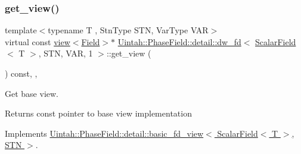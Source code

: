 \subsubsection{\texorpdfstring{get\+\_\+view()}{get\_view()}\hspace{0.1cm}{\footnotesize\ttfamily [2/2]}}
{\footnotesize\ttfamily template$<$typename T , Stn\+Type S\+TN, Var\+Type V\+AR$>$ \\
virtual const \hyperlink{classUintah_1_1PhaseField_1_1detail_1_1view}{view}$<$\hyperlink{structUintah_1_1PhaseField_1_1ScalarField}{Field}$>$$\ast$ \hyperlink{classUintah_1_1PhaseField_1_1detail_1_1dw__fd}{Uintah\+::\+Phase\+Field\+::detail\+::dw\+\_\+fd}$<$ \hyperlink{structUintah_1_1PhaseField_1_1ScalarField}{Scalar\+Field}$<$ T $>$, S\+TN, V\+AR, 1 $>$\+::get\+\_\+view (\begin{DoxyParamCaption}{ }\end{DoxyParamCaption}) const\hspace{0.3cm}{\ttfamily [inline]}, {\ttfamily [override]}, {\ttfamily [virtual]}}



Get base view. 

\begin{DoxyReturn}{Returns}
const pointer to base view implementation 
\end{DoxyReturn}


Implements \hyperlink{classUintah_1_1PhaseField_1_1detail_1_1basic__fd__view_3_01ScalarField_3_01T_01_4_00_01STN_01_4_a006d6f7c6fd81ff2c8d53f59656a23dc}{Uintah\+::\+Phase\+Field\+::detail\+::basic\+\_\+fd\+\_\+view$<$ Scalar\+Field$<$ T $>$, S\+T\+N $>$}.

\mbox{\label{classUintah_1_1PhaseField_1_1detail_1_1dw__fd_3_01ScalarField_3_01T_01_4_00_01STN_00_01VAR_00_011_01_4_abd0db288b2cc873ba3205b69d94cf158}} 

